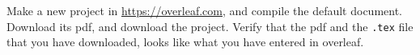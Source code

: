\label{latex:smallest}
Make a new project in \url{https://overleaf.com}, and compile the default document. Download its pdf, and download the project. Verify that the pdf and the \lstinline[language=console]{.tex} file that you have downloaded, looks like what you have entered in overleaf.